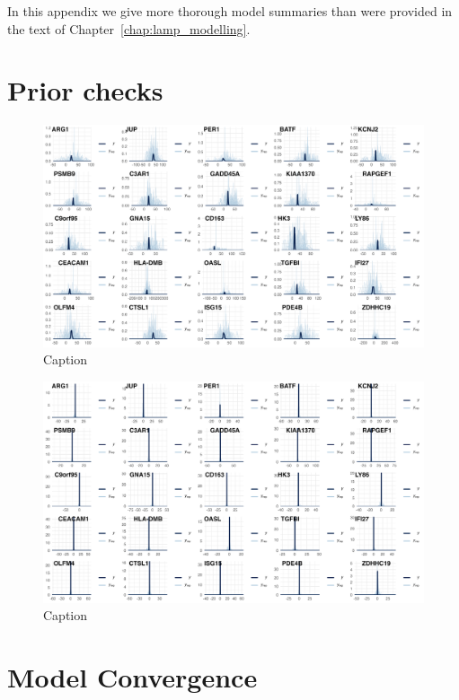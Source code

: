 \documentclass[../thesis.tex]{subfiles}
\begin{document}
In this appendix we give more thorough model summaries than were provided in the text of Chapter~\ref{chap:lamp_modelling}.
\section{Prior checks}

\begin{figure}
    \centering
    \includegraphics[width=\textwidth]{figures/chapter2/clinical_single_target_offset_priors_fig.png}
    \caption{Caption}
    \label{fig:clinical_single_target_offset_priors_fig}
\end{figure}

\begin{figure}
    \centering
    \includegraphics[width=\textwidth]{figures/chapter2/clinical_single_target_rate_priors_fig.png}
    \caption{Caption}
    \label{fig:clinical_single_target_rate_priors_fig}
\end{figure}


\section{Model Convergence}
\end{document}
